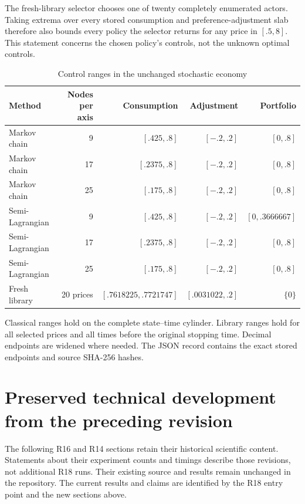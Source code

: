 The fresh-library selector chooses one of twenty completely enumerated actors. Taking extrema over every stored consumption and preference-adjustment slab therefore also bounds every policy the selector returns for any price in $[.5,8]$. This statement concerns the chosen policy's controls, not the unknown optimal controls.
\begin{table}[htbp]\centering\small
\caption{Control ranges in the unchanged stochastic economy}\label{tab:r18classicalcontrols}
\begin{tabular}{lrrrr}\toprule
Method & Nodes per axis & Consumption & Adjustment & Portfolio\\\midrule
Markov chain & 9 & $[.425,.8]$ & $[-.2,.2]$ & $[0,.8]$\\
Markov chain & 17 & $[.2375,.8]$ & $[-.2,.2]$ & $[0,.8]$\\
Markov chain & 25 & $[.175,.8]$ & $[-.2,.2]$ & $[0,.8]$\\
Semi-Lagrangian & 9 & $[.425,.8]$ & $[-.2,.2]$ & $[0,.3666667]$\\
Semi-Lagrangian & 17 & $[.2375,.8]$ & $[-.2,.2]$ & $[0,.8]$\\
Semi-Lagrangian & 25 & $[.175,.8]$ & $[-.2,.2]$ & $[0,.8]$\\\midrule
Fresh library & 20 prices & $[.7618225,.7721747]$ & $[.0031022,.2]$ & $\{0\}$\\
\bottomrule\end{tabular}
\par\smallskip\parbox{.98\linewidth}{\footnotesize Classical ranges hold on the complete state--time cylinder. Library ranges hold for all selected prices and all times before the original stopping time. Decimal endpoints are widened where needed. The JSON record contains the exact stored endpoints and source SHA-256 hashes.}
\end{table}

\section{Preserved technical development from the preceding revision}
The following R16 and R14 sections retain their historical scientific content. Statements about their experiment counts and timings describe those revisions, not additional R18 runs. Their existing source and results remain unchanged in the repository. The current results and claims are identified by the R18 entry point and the new sections above.

